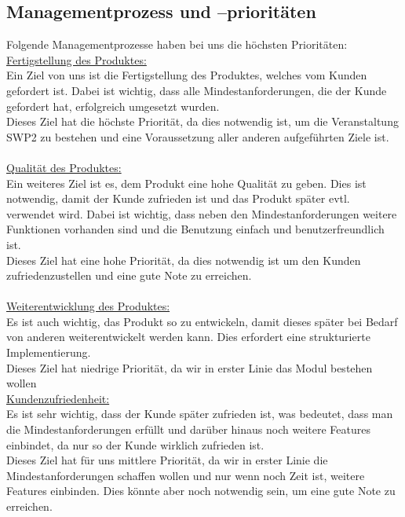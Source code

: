 \documentclass[fontsize=12pt,paper=a4,twoside]{scrartcl}
\begin{document}
\subsection{Managementprozess und --prioritäten}
Folgende Managementprozesse haben bei uns die höchsten Prioritäten:
\bigskip \\
\underline{Fertigstellung des Produktes:} \\
Ein Ziel von uns ist die Fertigstellung des Produktes, welches vom Kunden gefordert ist. Dabei ist wichtig, dass alle Mindestanforderungen, die der Kunde gefordert hat, erfolgreich umgesetzt wurden.\\
Dieses Ziel hat die höchste Priorität, da dies notwendig ist, um die Veranstaltung SWP2 zu bestehen und eine Voraussetzung aller anderen aufgeführten Ziele ist.\\
\bigskip \\
\underline{Qualität des Produktes:} \\
Ein weiteres Ziel ist es, dem Produkt eine hohe Qualität zu geben. Dies ist notwendig, damit der Kunde zufrieden ist und das Produkt später evtl. verwendet wird. Dabei ist wichtig, dass neben den Mindestanforderungen weitere Funktionen vorhanden sind und die Benutzung einfach und benutzerfreundlich ist.\\
Dieses Ziel hat eine hohe Priorität, da dies notwendig ist um den Kunden zufriedenzustellen und eine gute Note zu erreichen.\\
\bigskip \\
\underline{Weiterentwicklung des Produktes:} \\
Es ist auch wichtig, das Produkt so zu entwickeln, damit dieses später bei Bedarf von anderen weiterentwickelt werden kann. Dies erfordert eine strukturierte Implementierung.\\
Dieses Ziel hat niedrige Priorität, da wir in erster Linie das Modul bestehen wollen
\bigskip \\
\underline{Kundenzufriedenheit:}\\
Es ist sehr wichtig, dass der Kunde später zufrieden ist, was bedeutet, dass man die Mindestanforderungen erfüllt und darüber hinaus noch weitere Features einbindet, da nur so der Kunde wirklich zufrieden ist. \\
Dieses Ziel hat für uns mittlere Priorität, da wir in erster Linie die Mindestanforderungen schaffen wollen und nur wenn noch Zeit ist, weitere Features einbinden. Dies könnte aber noch notwendig sein, um eine gute Note zu erreichen.\\
\end{document}
